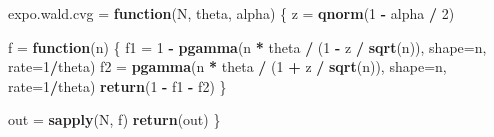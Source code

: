 \documentclass[]{article}
\newenvironment{Shaded}{\begin{snugshade}}{\end{snugshade}}
\newcommand{\KeywordTok}[1]{\textcolor[rgb]{0.13,0.29,0.53}{\textbf{#1}}}
\newcommand{\DataTypeTok}[1]{\textcolor[rgb]{0.13,0.29,0.53}{#1}}
\newcommand{\DecValTok}[1]{\textcolor[rgb]{0.00,0.00,0.81}{#1}}
\newcommand{\StringTok}[1]{\textcolor[rgb]{0.31,0.60,0.02}{#1}}
\newcommand{\ControlFlowTok}[1]{\textcolor[rgb]{0.13,0.29,0.53}{\textbf{#1}}}
\newcommand{\OperatorTok}[1]{\textcolor[rgb]{0.81,0.36,0.00}{\textbf{#1}}}
\newcommand{\NormalTok}[1]{#1}
\begin{document}
\begin{Shaded}
\begin{Highlighting}[]
\NormalTok{expo.wald.cvg =}\StringTok{ }\ControlFlowTok{function}\NormalTok{(N, theta, alpha) \{}
\NormalTok{    z =}\StringTok{ }\KeywordTok{qnorm}\NormalTok{(}\DecValTok{1} \OperatorTok{-}\StringTok{ }\NormalTok{alpha }\OperatorTok{/}\StringTok{ }\DecValTok{2}\NormalTok{)}
    
\NormalTok{  f =}\StringTok{ }\ControlFlowTok{function}\NormalTok{(n) \{}
\NormalTok{    f1 =}\StringTok{ }\DecValTok{1} \OperatorTok{-}\StringTok{ }\KeywordTok{pgamma}\NormalTok{(n }\OperatorTok{*}\StringTok{ }\NormalTok{theta }\OperatorTok{/}\StringTok{ }\NormalTok{(}\DecValTok{1} \OperatorTok{-}\StringTok{ }\NormalTok{z }\OperatorTok{/}\StringTok{ }\KeywordTok{sqrt}\NormalTok{(n)), }
                    \DataTypeTok{shape=}\NormalTok{n, }\DataTypeTok{rate=}\DecValTok{1}\OperatorTok{/}\NormalTok{theta)}
\NormalTok{    f2 =}\StringTok{ }\KeywordTok{pgamma}\NormalTok{(n }\OperatorTok{*}\StringTok{ }\NormalTok{theta }\OperatorTok{/}\StringTok{ }\NormalTok{(}\DecValTok{1} \OperatorTok{+}\StringTok{ }\NormalTok{z }\OperatorTok{/}\StringTok{ }\KeywordTok{sqrt}\NormalTok{(n)), }
                \DataTypeTok{shape=}\NormalTok{n, }\DataTypeTok{rate=}\DecValTok{1}\OperatorTok{/}\NormalTok{theta)}
    \KeywordTok{return}\NormalTok{(}\DecValTok{1} \OperatorTok{-}\StringTok{ }\NormalTok{f1 }\OperatorTok{-}\StringTok{ }\NormalTok{f2)}
\NormalTok{  \}}
  
\NormalTok{  out =}\StringTok{ }\KeywordTok{sapply}\NormalTok{(N, f)}
  \KeywordTok{return}\NormalTok{(out)}
\NormalTok{\}}
\end{Highlighting}
\end{Shaded}
\end{document}

